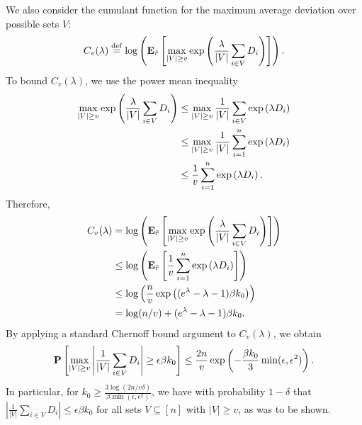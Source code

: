 We also consider the cumulant function for the maximum average deviation over 
possible sets $V$:
\begin{equation}
\label{eq:def-C}
C_v(\lambda) \stackrel{\rm def}{=} \log\left( \mathbf{E}_{\tilde{r}}\left[ \max_{|V| \geq v} \exp\left( \frac{\lambda}{|V|} \sum_{i \in V} D_{i} \right)\right] \right).
\end{equation}
To bound $C_v(\lambda)$, we use the power mean inequality
\begin{align}
\max_{|V| \geq v} \exp\left( \frac{\lambda}{|V|} \sum_{i \in V} D_{i} \right) 
 &\leq \max_{|V| \geq v} \frac{1}{|V|} \sum_{i \in V} \exp\left( \lambda D_{i} \right) \\
 &\leq \max_{|V| \geq v} \frac{1}{|V|} \sum_{i=1}^n \exp\left( \lambda D_i \right) \\
 &\leq \frac{1}{v} \sum_{i=1}^n \exp\left( \lambda D_i \right).
\end{align}
Therefore, 
\begin{align}
C_v(\lambda) &= \log\left( \mathbf{E}_{\tilde{r}}\left[ \max_{|V| \geq v} \exp\left( \frac{\lambda}{|V|} \sum_{i \in V} D_{i} \right)\right] \right) \\
 &\leq \log\left( \mathbf{E}_{\tilde{r}}\left[\frac{1}{v} \sum_{i=1}^n \exp\left( \lambda D_i \right)\right] \right) \\
 &\leq \log\left( \frac{n}{v}\exp\left( (e^{\lambda} - \lambda - 1)\beta k_0 \right) \right) \\
 &= \log(n/v) + (e^{\lambda} - \lambda - 1)\beta k_0.
\end{align}
By applying a standard Chernoff bound argument to $C_v(\lambda)$, we obtain
\begin{equation}
\label{eq:chernoff-conclusion}
\mathbf{P}\left[\max_{|V| \geq v} \left|\frac{1}{|V|} \sum_{i \in V} D_{i}\right| \geq \epsilon \beta k_0\right] \leq \frac{2n}{v}\exp\left( -\frac{\beta k_0}{3}\min(\epsilon,\epsilon^2) \right).
\end{equation}
In particular, for
$k_0 \geq \frac{3\log(2n/v\delta)}{\beta\min(\epsilon,\epsilon^2)}$, 
we have with probability $1-\delta$ that 
$\left|\frac{1}{|V|} \sum_{i \in V} D_{i}\right| \leq \epsilon \beta k_0$ 
for all sets $V \subseteq [n]$ with $|V| \geq v$, as was to be shown.
